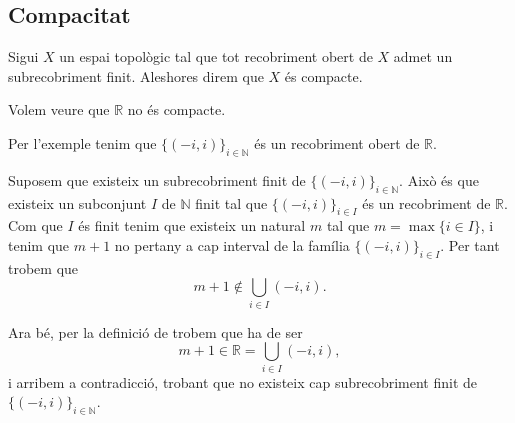 \documentclass[../../Main.tex]{subfiles}
\begin{document}
	\subsection{Compacitat}
	\begin{definition}[Compacte]
		\label{def:espai topològic compacte}
		Sigui \(X\) un espai topològic tal que tot recobriment obert de \(X\) admet un subrecobriment finit. Aleshores direm que \(X\) és compacte.
	\end{definition}
	\begin{example}
		\label{ex:R no és compacte}
		Volem veure que \(\mathbb{R}\) no és compacte.
		\begin{solution}
			Per l'exemple  tenim que \(\{(-i,i)\}_{i\in\mathbb{N}}\) és un recobriment obert de \(\mathbb{R}\).
			
			Suposem que existeix un subrecobriment finit de \(\{(-i,i)\}_{i\in\mathbb{N}}\). Això és que existeix un subconjunt \(I\) de \(\mathbb{N}\) finit tal que \(\{(-i,i)\}_{i\in I}\) és un recobriment de \(\mathbb{R}\). Com que \(I\) és finit tenim que existeix un natural \(m\) tal que \(m=\max\{i\in I\}\), i tenim que \(m+1\) no pertany a cap interval de la família \(\{(-i,i)\}_{i\in I}\). Per tant trobem que
			\[
			    m+1\notin\bigcup_{i\in I}(-i,i).
			\]
			
			Ara bé, per la definició de  trobem que ha de ser
			\[
			    m+1\in\mathbb{R}=\bigcup_{i\in I}(-i,i),
			\]
			i arribem a contradicció, trobant que no existeix cap subrecobriment finit de \(\{(-i,i)\}_{i\in\mathbb{N}}\).
		\end{solution}
	\end{example}
\end{document}

